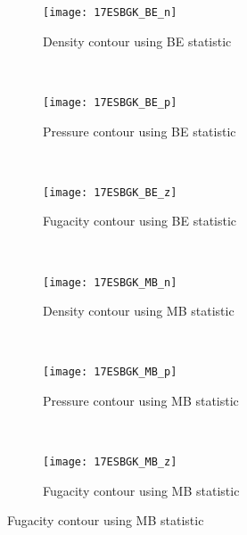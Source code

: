 \documentclass{rsproca}%
\begin{document}
\begin{figure}
        \centering
        \begin{subfigure}[b]{0.32\textwidth}
                \centering
                \texttt{[image: 17ESBGK\_BE\_n]}
                \caption{Density contour using BE statistic}
                \label{fig:17ESBGK_BE_n}
        \end{subfigure}%
        ~ %
        \begin{subfigure}[b]{0.32\textwidth}
                \centering
                \texttt{[image: 17ESBGK\_BE\_p]}
                \caption{Pressure contour using BE statistic}
                \label{fig:17ESBGK_BE_p}
        \end{subfigure}
        ~ %
        \begin{subfigure}[b]{0.32\textwidth}
                \centering
                \texttt{[image: 17ESBGK\_BE\_z]}
                \caption{Fugacity contour using BE statistic}
                \label{fig:17ESBGK_BE_z}
        \end{subfigure}
				~ %
        \begin{subfigure}[b]{0.32\textwidth}
                \centering
                \texttt{[image: 17ESBGK\_MB\_n]}
                \caption{Density contour using MB statistic}
                \label{fig:17ESBGK_MB_n}
        \end{subfigure}
        ~ %
        \begin{subfigure}[b]{0.32\textwidth}
                \centering
                \texttt{[image: 17ESBGK\_MB\_p]}
                \caption{Pressure contour using MB statistic}
                \label{fig:17ESBGK_MB_p}
        \end{subfigure}
				~ %
        \begin{subfigure}[b]{0.32\textwidth}
                \centering
                \texttt{[image: 17ESBGK\_MB\_z]}
                \caption{Fugacity contour using MB statistic}

\end{subfigure}
\end{figure}
\end{document}
